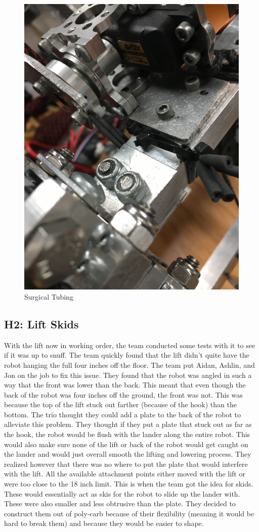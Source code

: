 \documentclass{article}
\begin{document}
\begin{figure}
    \centering
    \includegraphics[width=.6 \textwidth]{21_01-21/images/tubing.JPG}
    \caption{Surgical Tubing}
    \label{fig:tubing}
\end{figure}

\subsection{H2: Lift Skids}

With the lift now in working order, the team conducted some tests with it to see if it was up to snuff. The team quickly found that the lift didn't quite have the robot hanging the full four inches off the floor. The team put Aidan, Ashlin, and Jon on the job to fix this issue. They found that the robot was angled in such a way that the front was lower than the back. This meant that even though the back of the robot was four inches off the ground, the front was not. This was because the top of the lift stuck out farther (because of the hook) than the bottom. The trio thought they could add a plate to the back of the robot to alleviate this problem. They thought if they put a plate that stuck out as far as the hook, the robot would be flush with the lander along the entire robot. This would also make sure none of the lift or back of the robot would get caught on the lander and would just overall smooth the lifting and lowering process. They realized however that there was no where to put the plate that would interfere with the lift. All the available attachment points either moved with the lift or were too close to the 18 inch limit. This is when the team got the idea for skids. These would essentially act as skis for the robot to slide up the lander with. These were also smaller and less obtrusive than the plate. They decided to construct them out of poly-carb because of their flexibility (meaning it would be hard to break them) and because they would be easier to shape.
\end{document}
